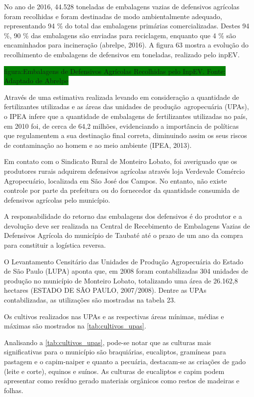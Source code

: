 	No ano de 2016, 44.528 toneladas de embalagens vazias de defensivos agrícolas foram recolhidas e foram destinadas de modo ambientalmente adequado, representando 94 \% do total das embalagens primárias comercializadas. Destes 94 \%, 90 \% das embalagens são enviadas para reciclagem, enquanto que 4 \% são encaminhados para incineração (\gls{abrelpe}, 2016). A figura 63 mostra a evolução do recolhimento de embalagens de defensivos em toneladas, realizado pelo inpEV.
	
	\colorbox{green}{figura:Embalagens de Defensivos Agrícolas Recolhidas pelo InpEV. Fonte: Adaptado de Abrelpe}
	
	Através de uma estimativa realizada levando em consideração a quantidade de fertilizantes utilizadas e as áreas das unidades de produção agropecuária (UPAs), o IPEA infere que a quantidade de embalagens de fertilizantes utilizadas no país, em 2010 foi, de cerca de 64,2 milhões, evidenciando a importância de políticas que regulamentem a sua destinação final correta, diminuindo assim os seus riscos de contaminação ao homem e ao meio ambiente (IPEA, 2013).
	
	Em contato com o Sindicato Rural de Monteiro Lobato, foi averiguado que os produtores rurais adquirem defensivos agrícolas através loja Verdevale Comércio Agropecuário, localizada em São José dos Campos. No entanto, não existe controle por parte da prefeitura ou do fornecedor da quantidade consumida de defensivos agrícolas pelo município. 
	
	A responsabilidade do retorno das embalagens dos defensivos é do produtor e a devolução deve ser realizada na Central de Recebimento de Embalagens Vazias de Defensivos Agrícola do município de Taubaté até o prazo de um ano da compra para constituir a logística reversa.
	
	O Levantamento Censitário das Unidades de Produção Agropecuária do Estado de São Paulo (LUPA) aponta que, em 2008 foram contabilizadas 304 unidades de produção no município de Monteiro Lobato, totalizando uma área de 26.162,8 hectares (ESTADO DE SÃO PAULO, 2007/2008). Dentre as UPAs contabilizadas, as utilizações são mostradas na tabela 23.
	
	

	Os cultivos realizados nas UPAs e as respectivas áreas mínimas, médias e máximas são mostrados na \autoref{tab:cultivos_upas}.
	
	
	
	Analisando a \autoref{tab:cultivos_upas}, pode-se notar que as culturas mais significativas para o município são braquiárias, eucaliptos, gramíneas para pastagem e o capim-naiper e quanto a pecuária, destacam-se as criações de gado (leite e corte), equinos e suínos. As culturas de eucaliptos e capim podem apresentar como resíduo gerado materiais orgânicos como restos de madeiras e folhas.
	
